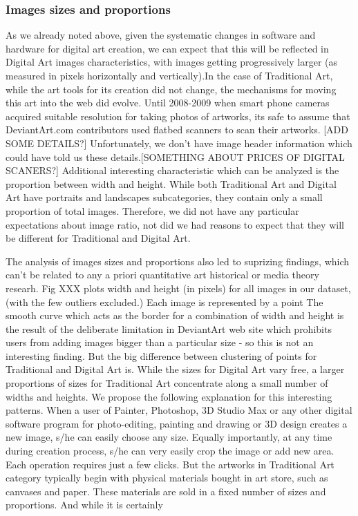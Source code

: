 \documentclass[letterpaper]{article}
\begin{document}
\subsubsection{Images sizes and proportions} As we already noted above, given the systematic changes in software and hardware for digital art creation, we can expect that this will be reflected in Digital Art images characteristics, with images getting progressively larger (as measured in pixels horizontally and vertically).In the case of Traditional Art, while the art tools for its creation did not change, the mechanisms for moving this art into the web did evolve. Until 2008-2009 when smart phone cameras acquired suitable resolution for taking photos of artworks, its safe to assume that DeviantArt.com contributors used flatbed scanners to scan their artworks. [ADD SOME DETAILS?] Unfortunately, we don't have image header information which could have told us these details.[SOMETHING ABOUT PRICES OF DIGITAL SCANERS?] Additional interesting characteristic which can be analyzed is the proportion between width and height. While both Traditional Art and Digital Art have portraits and landscapes subcategories, they contain only a small proportion of total images. Therefore, we did not have any particular expectations about image ratio, not did we had reasons to expect that they will be different for Traditional and Digital Art.

The analysis of images sizes and proportions also led to suprizing findings, which can't be related to any a priori quantitative art historical or media theory researh. Fig XXX plots width and height (in pixels) for all images in our dataset, (with the few outliers excluded.) Each image is represented by a point The smooth curve which acts as the border for a combination of width and height is the result of the deliberate limitation in DeviantArt web site which prohibits users from adding images bigger than a particular size - so this is not an interesting finding. But the big difference between clustering of points for Traditional and Digital Art is. While the sizes for Digital Art vary free, a larger proportions of sizes for Traditional Art concentrate along a small number of widths and heights. We propose the following explanation for this interesting patterns. When a user of Painter, Photoshop, 3D Studio Max or any other digital software program for photo-editing, painting and drawing or 3D design creates a new image, s/he can easily choose any size. Equally importantly, at any time during creation process, s/he can very easily crop the image or add new area. Each operation requires just a few clicks. But the artworks in Traditional Art category typically begin with physical materials bought in art store, such as canvases and paper. These materials are sold in a fixed number of sizes and proportions. And while it is certainly   
\end{document}
